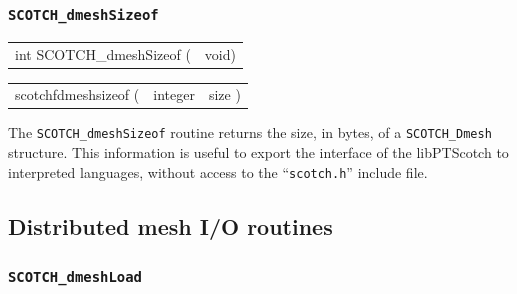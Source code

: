 \subsubsection{\texttt{SCOTCH\_dmeshSizeof}}

\begin{itemize}
\progsyn

{\tt\begin{tabular}{l@{}l}
int SCOTCH\_dmeshSizeof ( & void)
\end{tabular}}

{\tt\begin{tabular}{l@{}ll}
scotchfdmeshsizeof ( & integer & size )
\end{tabular}}

\progdes

The {\tt SCOTCH\_dmeshSizeof} routine returns the size, in bytes, of a
{\tt SCOTCH\_\lbt Dmesh} structure. This information is useful to
export the interface of the {\sc libPTScotch} to interpreted languages,
without access to the ``{\tt scotch.h}'' include file.
\end{itemize}

\subsection{Distributed mesh I/O routines}

\subsubsection{{\tt SCOTCH\_dmeshLoad}}
\label{sec-lib-func-dmeshload}


